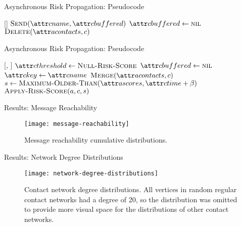 \documentclass[11pt]{beamer}
\begin{document}
\begin{frame}{Asynchronous Risk Propagation: Pseudocode}
\begin{function}{\nHandleFlushTimeout}[\vActor]
  \ForEach{$\vContact \in \aActorContacts$}
    \If{$\aContactBuffered \notEquals \nil$}
      \State $\cSend[\aContactName, \aContactBuffered]$
      \State $\aContactBuffered \assign \nil$
    \EndIf
      \State $\cDelete[\aActorContacts, \vContact]$
    \EndIf
  \EndFor
\end{function}
\end{frame}

\begin{frame}{Asynchronous Risk Propagation: Pseudocode}
\begin{function}{\nHandleContact}[\vActor, \vContact]
    \State $\aContactThreshold \assign \cNullRiskScore$
    \State $\aContactBuffered \assign \nil$
    \State $\aContactKey \assign \aContactName$
    \State $\cMerge[\aActorContacts, \vContact]$
    \State $\vScore \assign \cMaximumOlderThan[\aActorScores, \aContactTime + \pTimeBuffer]$
    \State $\cApplyRiskScore[\vActor, \vContact, \vScore]$
  \EndIf
\end{function}
\end{frame}

\begin{frame}{Results: Message Reachability}
\begin{figure}
  \centering
  \texttt{[image: message-reachability]}
  \caption[Message reachability cumulative distributions]{Message reachability cumulative distributions.}
\end{figure}
\end{frame}

\begin{frame}{Results: Network Degree Distributions}
\begin{figure}
  \centering
  \texttt{[image: network-degree-distributions]}
  \caption[Contact network degree distributions]{Contact network degree distributions. All vertices in random regular contact networks had a degree of 20, so the distribution was omitted to provide more visual space for the distributions of other contact networks.}
\end{figure}
\end{frame}
\end{document}
